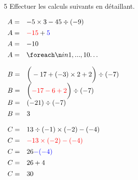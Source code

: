 \documentclass[a4paper]{book}
\begin{document}
{\newpage


     \begin{exerciceNote}{5}
        Effectuer les calculs suivants en détaillant.

        \medskip

        \begin{minipage}{0.30\linewidth}
            $\begin{array}{ll}
                A = & -5\times3-45\div(-9) \\[1ex]
                A = & \textcolor{red}{-15}+\textcolor{blue}{5}\\[1ex]
                A = & -10\\[1ex]
                A = & \points[10]
            \end{array}$

            \vspace{1cm}

            $\begin{array}{ll}
                B = & \bigg(-17+(-3)\times2+2\bigg)\div(-7) \\[1ex]
 B = & \bigg(\textcolor{red}{-17-6+2}\bigg)\div(-7)\\[1ex]
                B = & (-21)\div(-7)\\[1ex]
                B = & 3
            \end{array}$
        \end{minipage}
        \hfill
        \begin{minipage}{0.30\linewidth}
            $\begin{array}{ll}
                C = & 13\div(-1)\times(-2)-(-4) \\[1ex]
                C = & \textcolor{red}{-13\times(-2)-(-4)} \\[1ex]
                C = & 26\textcolor{blue}{-(-4)} \\[1ex]
                C = & 26+4 \\[1ex]
                C = & 30
            \end{array}$

            \vspace{1cm}


\end{minipage}
\end{exerciceNote}}
\end{document}

